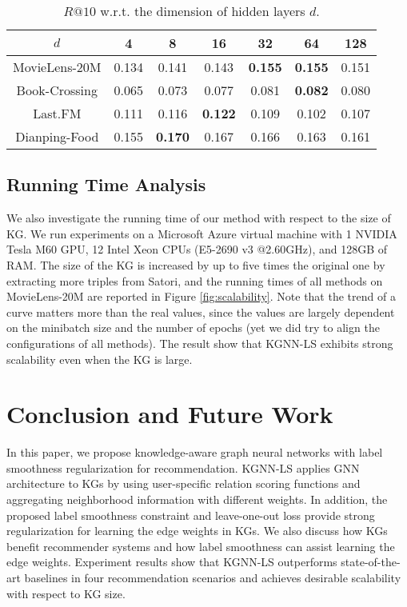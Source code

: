 \documentclass[sigconf]{acmart}
\begin{document}
			\begin{table}[t]
				\centering
				\setlength{\tabcolsep}{4pt}
				\begin{tabular}{c|cccccc}
					\hline
					$d$ & 4 & 8 & 16 & 32 & 64 & 128\\
					\hline
					MovieLens-20M & 0.134 & 0.141 & 0.143 & \textbf{0.155} & \textbf{0.155} & 0.151 \\
					Book-Crossing & 0.065 & 0.073 & 0.077 & 0.081 & \textbf{0.082} & 0.080 \\
					Last.FM & 0.111 & 0.116 & \textbf{0.122} & 0.109 & 0.102 & 0.107 \\
					Dianping-Food & 0.155 & \textbf{0.170} & 0.167 & 0.166 & 0.163 & 0.161 \\
					\hline
				\end{tabular}
				\vspace{0.05in}
				\caption{$R@10$ w.r.t. the dimension of hidden layers $d$.}
				\label{table:d}
				\vspace{-0.2in}
			\end{table}

		
	\subsection{Running Time Analysis}
		We also investigate the running time of our method with respect to the size of KG.
		We run experiments on a Microsoft Azure virtual machine with 1 NVIDIA Tesla M60 GPU, 12 Intel Xeon CPUs (E5-2690 v3 @2.60GHz), and 128GB of RAM.
		The size of the KG is increased by up to five times the original one by extracting more triples from Satori, and the running times of all methods on MovieLens-20M are reported in Figure \ref{fig:scalability}.
		Note that the trend of a curve matters more than the real values, since the values are largely dependent on the minibatch size and the number of epochs (yet we did try to align the configurations of all methods).
The result show that KGNN-LS exhibits strong scalability even when the KG is large.

			
	
\section{Conclusion and Future Work}
	In this paper, we propose knowledge-aware graph neural networks with label smoothness regularization for recommendation.
	KGNN-LS applies GNN architecture to KGs by using user-specific relation scoring functions and aggregating neighborhood information with different weights.	In addition, the proposed label smoothness constraint and leave-one-out loss provide strong regularization for learning the edge weights in KGs.
	We also discuss how KGs benefit recommender systems and how label smoothness can assist learning the edge weights.
	Experiment results show that KGNN-LS outperforms state-of-the-art baselines in four recommendation scenarios and achieves desirable scalability with respect to KG size.
	
\end{document}
